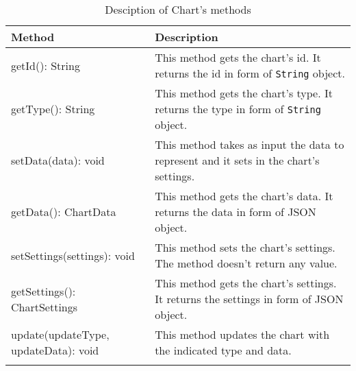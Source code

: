 \begin{description}
\begin{longtabu}{| X | X |}
			\hline
			\rowfont{\bf}
			Method &
			Description \\
			\hline \endhead
				getId(): String & This method gets the chart's id. It returns the id in form of \texttt{String} object. 
				\\ \hline
				getType(): String & This method gets the chart's type. It returns the type in form of \texttt{String} object.
				 \\ \hline
				setData(data): void & This method takes as input the data to represent and it sets in the chart's settings.
				\\ \hline
				getData(): ChartData & This method gets the chart's data. It returns the data in form of JSON object.
				\\ \hline
				setSettings(settings): void & This method sets the chart's settings. The method doesn't return any value.
				\\ \hline
				getSettings(): ChartSettings & This method gets the chart's settings. It returns the settings in form of JSON object.
				\\ \hline
				update(updateType, updateData): void & This method updates the chart with the indicated type and data.
				\\ \hline
				\caption{Desciption of Chart's methods}
			\end{longtabu}

	\end{description}
